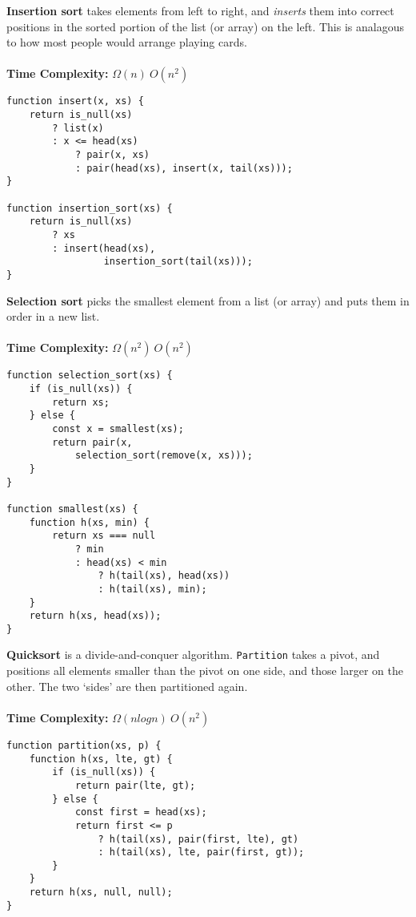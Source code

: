 \documentclass[a4paper]{article} \usepackage[backend=biber, style=numeric, sorting=none]{biblatex}
\begin{document}
\begin{multicols*}{4}
{\small\textbf{Insertion sort}} takes elements from left to right, and \textit{inserts} them into correct positions in the sorted portion of the list (or array) on the left. This is analagous to how most people would arrange playing cards.
\\ \\
\textbf{Time Complexity:} $\Omega(n)\ O(n^{2})$
\begin{verbatim}
function insert(x, xs) {
    return is_null(xs)
        ? list(x)
        : x <= head(xs)
            ? pair(x, xs)
            : pair(head(xs), insert(x, tail(xs)));
}

function insertion_sort(xs) {
    return is_null(xs)
        ? xs
        : insert(head(xs),
                 insertion_sort(tail(xs)));
}
\end{verbatim}

{\small\textbf{Selection sort}} picks the smallest element from a list (or array) and puts them in order in a new list.
\\ \\
\textbf{Time Complexity:} $\Omega(n^{2})\ O(n^{2})$
\begin{verbatim}
function selection_sort(xs) {
    if (is_null(xs)) {
        return xs;
    } else {
        const x = smallest(xs);
        return pair(x,
            selection_sort(remove(x, xs)));
    }
}

function smallest(xs) {
    function h(xs, min) {
        return xs === null
            ? min
            : head(xs) < min
                ? h(tail(xs), head(xs))
                : h(tail(xs), min);
    }
    return h(xs, head(xs));
}
\end{verbatim}
\vfill\null
\columnbreak
{\small\textbf{Quicksort}} is a divide-and-conquer algorithm. \texttt{Partition} takes a pivot, and positions all elements smaller than the pivot on one side, and those larger on the other. The two `sides' are then partitioned again.
\\ \\
\textbf{Time Complexity:} $\Omega(n log n)\ O(n^{2})$
\begin{verbatim}
function partition(xs, p) {
    function h(xs, lte, gt) {
        if (is_null(xs)) {
            return pair(lte, gt);
        } else {
            const first = head(xs);
            return first <= p
                ? h(tail(xs), pair(first, lte), gt)
                : h(tail(xs), lte, pair(first, gt));
        }
    }
    return h(xs, null, null);
}



\end{verbatim}
\end{multicols*}
\end{document}
